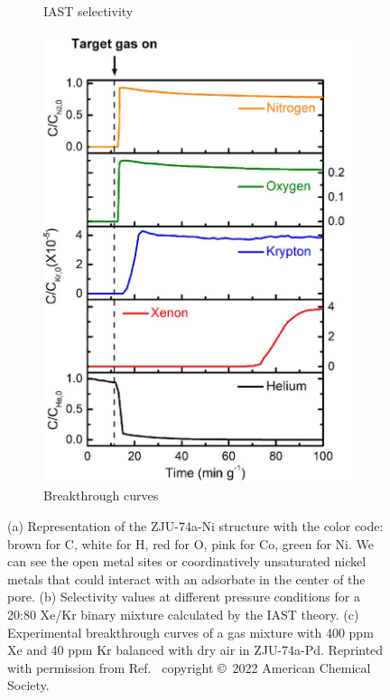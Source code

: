 \documentclass[main]{subfiles}
\begin{document}
\begin{figure}[ht]
\begin{subfigure}[b]{0.34\textwidth}
    \caption{IAST selectivity}\label{fgr:jacs_pei_iast}
  \end{subfigure}
  \hfill
  \begin{subfigure}[b]{0.25\textwidth}
    \centering
    \includegraphics[width=\textwidth]{figures/6-perspectives/jacs_pei_breakthrough.jpg}
    \caption{Breakthrough curves}\label{fgr:jacs_pei_breakthrough}
  \end{subfigure}
  \caption{ (a) Representation of the ZJU-74a-Ni structure with the color code: brown for C, white for H, red for O, pink for Co, green for Ni. We can see the open metal sites or coordinatively unsaturated nickel metals that could interact with an adsorbate in the center of the pore. (b) Selectivity values at different pressure conditions for a 20:80 Xe/Kr binary mixture calculated by the IAST theory. (c) Experimental breakthrough curves of a gas mixture with 400 ppm Xe and 40 ppm Kr balanced with dry air in ZJU-74a-Pd. Reprinted with permission from Ref.~\cite{Pei_2022} copyright \copyright\ 2022 American Chemical Society.}\label{fgr:jacs_pei}
\end{figure}
\end{document}
